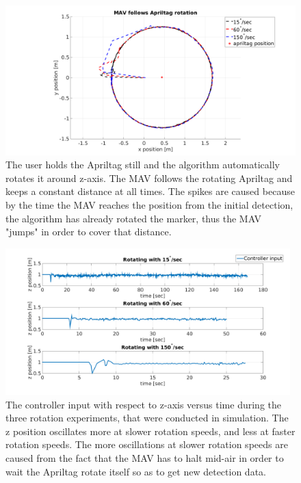 \begin{figure}
   \centering
   \includegraphics[width=1.00\textwidth]{images/MAV_controller_input_rotation_tracking.pdf}
   \caption{The user holds the Apriltag still and the algorithm automatically rotates it around z-axis. The MAV follows the rotating Apriltag and keeps a constant distance at all times. The spikes are caused because by the time the MAV reaches the position from the initial detection, the algorithm has already rotated the marker, thus the MAV "jumps" in order to cover that distance.}
   \label{pics:xyRotation}
\end{figure}

\begin{figure}
   \centering
   \includegraphics[width=0.98\textwidth]{images/sim_z_axis_during_rotation.pdf}
   \caption{The controller input with respect to z-axis versus time during the three rotation experiments, that were conducted in simulation. The z position oscillates more at slower rotation speeds, and less at faster rotation speeds. The more oscillations at slower rotation speeds are caused from the fact that the MAV has to halt mid-air in order to wait the Apriltag rotate itself so as to get new detection data.}
   \label{pics:zRotationCOntroller}
\end{figure}


